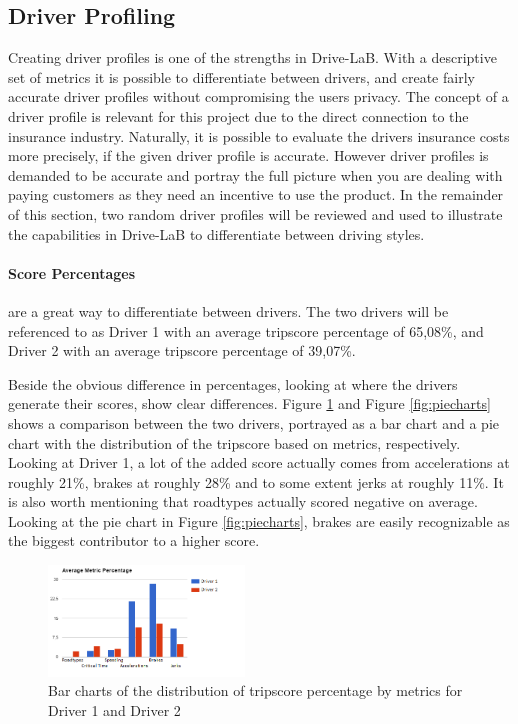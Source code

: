 \subsection{Driver Profiling}\label{subsec:userprofiling}

Creating driver profiles is one of the strengths in Drive-LaB. With a descriptive set of metrics it is possible to differentiate between drivers, and create fairly accurate driver profiles without compromising the users privacy. The concept of a driver profile is relevant for this project due to the direct connection to the insurance industry. Naturally, it is possible to evaluate the drivers insurance costs more precisely, if the given driver profile is accurate. However driver profiles is demanded to be accurate and portray the full picture when you are dealing with paying customers\citep{art:insurtelematics} as they need an incentive to use the product. In the remainder of this section, two random driver profiles will be reviewed and used to illustrate the capabilities in Drive-LaB to differentiate between driving styles.  

\paragraph{Score Percentages} are a great way to differentiate between drivers. The two drivers will be referenced to as Driver 1 with an average tripscore percentage of 65,08\%, and Driver 2 with an average tripscore percentage of 39,07\%.

Beside the obvious difference in percentages, looking at where the drivers generate their scores, show clear differences. Figure \ref{fig:avgmetricper} and Figure \ref{fig:piecharts} shows a comparison between the two drivers, portrayed as a bar chart and a pie chart with the distribution of the tripscore based on metrics, respectively. Looking at Driver 1, a lot of the added score actually comes from accelerations at roughly 21\%, brakes at roughly 28\% and to some extent jerks at roughly 11\%. It is also worth mentioning that roadtypes actually scored negative on average. Looking at the pie chart in Figure \ref{fig:piecharts}, brakes are easily recognizable as the biggest contributor to a higher score.

\begin{figure}[h]
\centering
\includegraphics[width=0.465\textwidth]{Pictures/AverageMetricsPercentage}
\caption{Bar charts of the distribution of tripscore percentage by metrics for Driver 1 and Driver 2}
\label{fig:avgmetricper}
\end{figure}

